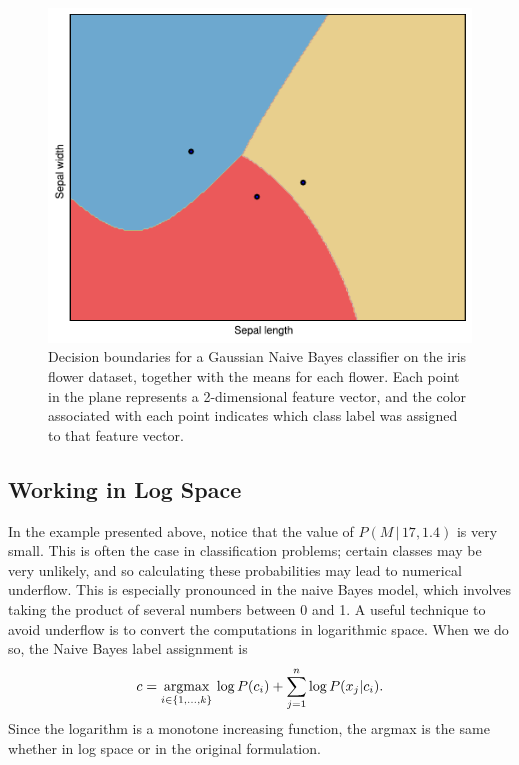 \begin{figure}
	\centering
	\includegraphics[width=.90\textwidth]{decision_boundary}
	\caption{Decision boundaries for a Gaussian Naive Bayes classifier on the iris flower dataset, together with the means
for each flower. Each point in the plane represents a 2-dimensional feature vector, and the color associated with each point indicates which class label was assigned to that feature vector.}
	\label{fig:decision_boundary}
\end{figure}

\subsection*{Working in Log Space}
In the example presented above, notice that the value of $P(M\,|\,17,1.4)$ is very small.
This is often the case in classification problems; certain classes may be very unlikely, and so calculating these probabilities may lead to numerical underflow.
This is especially pronounced in the naive Bayes model, which involves taking the product of several numbers between
0 and 1.
A useful technique to avoid underflow is to convert the computations in logarithmic space.
When we do so, the Naive Bayes label assignment is
\[
c = \underset{i \in \{1, \ldots, k\}}{\mbox{argmax}}\, \log P(c_i) + \sum_{j=1}^n \log P(x_j|c_i).
\]
Since the logarithm is a monotone increasing function, the argmax is the same whether in log space or
in the original formulation.

